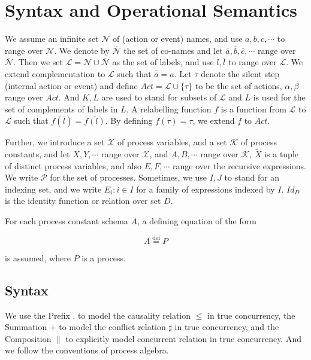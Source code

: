 \section{Syntax and Operational Semantics}\label{sos}

We assume an infinite set $\mathcal{N}$ of (action or event) names, and use $a,b,c,\cdots$ to range over $\mathcal{N}$. We denote by $\overline{\mathcal{N}}$ the set of co-names and let $\overline{a},\overline{b},\overline{c},\cdots$ range over $\overline{\mathcal{N}}$. Then we set $\mathcal{L}=\mathcal{N}\cup\overline{\mathcal{N}}$ as the set of labels, and use $l,\overline{l}$ to range over $\mathcal{L}$. We extend complementation to $\mathcal{L}$ such that $\overline{\overline{a}}=a$. Let $\tau$ denote the silent step (internal action or event) and define $Act=\mathcal{L}\cup\{\tau\}$ to be the set of actions, $\alpha,\beta$ range over $Act$. And $K,L$ are used to stand for subsets of $\mathcal{L}$ and $\overline{L}$ is used for the set of complements of labels in $L$. A relabelling function $f$ is a function from $\mathcal{L}$ to $\mathcal{L}$ such that $f(\overline{l})=\overline{f(l)}$. By defining $f(\tau)=\tau$, we extend $f$ to $Act$.

Further, we introduce a set $\mathcal{X}$ of process variables, and a set $\mathcal{K}$ of process constants, and let $X,Y,\cdots$ range over $\mathcal{X}$, and $A,B,\cdots$ range over $\mathcal{K}$, $\widetilde{X}$ is a tuple of distinct process variables, and also $E,F,\cdots$ range over the recursive expressions. We write $\mathcal{P}$ for the set of processes. Sometimes, we use $I,J$ to stand for an indexing set, and we write $E_i:i\in I$ for a family of expressions indexed by $I$. $Id_D$ is the identity function or relation over set $D$.

For each process constant schema $A$, a defining equation of the form

$$A\overset{\text{def}}{=}P$$

is assumed, where $P$ is a process.

\subsection{Syntax}

We use the Prefix $.$ to model the causality relation $\leq$ in true concurrency, the Summation $+$ to model the conflict relation $\sharp$ in true concurrency, and the Composition $\parallel$ to explicitly model concurrent relation in true concurrency. And we follow the conventions of process algebra.

